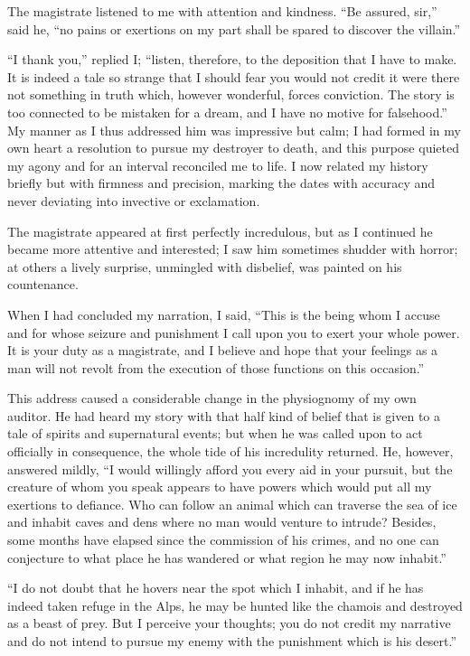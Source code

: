 \documentclass[12pt,openright]{book}
\begin{document}
The magistrate listened to me with attention and kindness. “Be assured, sir,” said he, “no pains or exertions on my part shall be spared to discover the villain.”

“I thank you,” replied I; “listen, therefore, to the deposition that I have to make. It is indeed a tale so strange that I should fear you would not credit it were there not something in truth which, however wonderful, forces conviction. The story is too connected to be mistaken for a dream, and I have no motive for falsehood.” My manner as I thus addressed him was impressive but calm; I had formed in my own heart a resolution to pursue my destroyer to death, and this purpose quieted my agony and for an interval reconciled me to life. I now related my history briefly but with firmness and precision, marking the dates with accuracy and never deviating into invective or exclamation.

The magistrate appeared at first perfectly incredulous, but as I continued he became more attentive and interested; I saw him sometimes shudder with horror; at others a lively surprise, unmingled with disbelief, was painted on his countenance.

When I had concluded my narration, I said, “This is the being whom I accuse and for whose seizure and punishment I call upon you to exert your whole power. It is your duty as a magistrate, and I believe and hope that your feelings as a man will not revolt from the execution of those functions on this occasion.”

This address caused a considerable change in the physiognomy of my own auditor. He had heard my story with that half kind of belief that is given to a tale of spirits and supernatural events; but when he was called upon to act officially in consequence, the whole tide of his incredulity returned. He, however, answered mildly, “I would willingly afford you every aid in your pursuit, but the creature of whom you speak appears to have powers which would put all my exertions to defiance. Who can follow an animal which can traverse the sea of ice and inhabit caves and dens where no man would venture to intrude? Besides, some months have elapsed since the commission of his crimes, and no one can conjecture to what place he has wandered or what region he may now inhabit.”

“I do not doubt that he hovers near the spot which I inhabit, and if he has indeed taken refuge in the Alps, he may be hunted like the chamois and destroyed as a beast of prey. But I perceive your thoughts; you do not credit my narrative and do not intend to pursue my enemy with the punishment which is his desert.”
\end{document}
